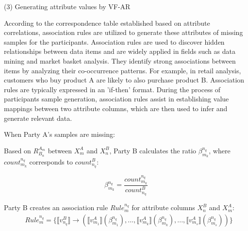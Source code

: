 \documentclass[final,1p,times]{elsarticle}
\begin{document}
(3) Generating attribute values by VF-AR 

According to the correspondence table established based on attribute correlations, association rules are utilized to generate these attributes of missing samples for the participants. Association rules\cite{34} are used to discover hidden relationships between data items and are widely applied in fields such as data mining and market basket analysis. They identify strong associations between items by analyzing their co-occurrence patterns. For example, in retail analysis, customers who buy product A are likely to also purchase product B. Association rules are typically expressed in an 'if-then' format. During the process of participants sample generation, association rules assist in establishing value mappings between two attribute columns, which are then used to infer and generate relevant data.

When Party A's samples are missing:


Based on \( R_{B_n}^{A_m} \) between \( X_m^A \) and \( X_n^B \), Party B calculates the ratio ${\beta_{m_k}^{n_q}}$, where ${count}_{{m_k}}^{{n_q}}$  corresponds to ${count}_{{n_q}}^{{B}}$:

\begin{equation}
	{\beta_{m_k}^{n_q}=\frac{count_{m_k}^{n_q}}{count_{n_q}^B}}
\end{equation}

Party B creates an association rule ${Rule_m^{n_q}}$ for attribute columns $X_n^B$ and $X_m^A$:
\begin{equation}
	\begin{aligned}
		& Rule_m^{n_q} =\{\llbracket v_{n_q}^B \rrbracket \to (\llbracket v_{m_1}^A \rrbracket (\beta_{m_1}^{n_q}),..., \llbracket v_{m_k}^A \rrbracket (\beta_{m_k}^{n_q}),...,\llbracket v_{m_s}^A \rrbracket (\beta_{m_s}^{n_q}))\}
	\end{aligned}
\end{equation}
\end{document}
